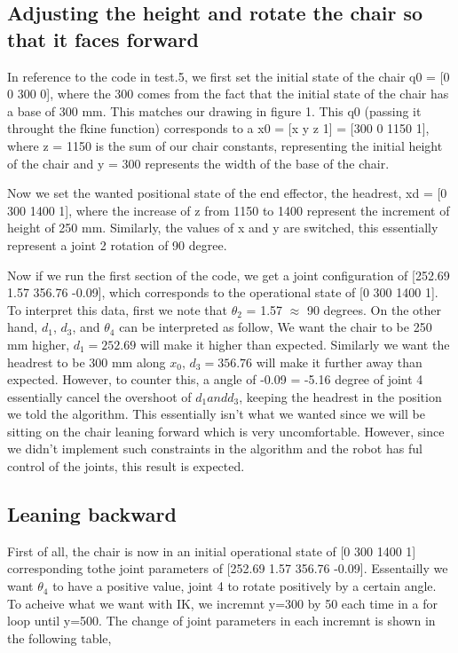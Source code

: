 \documentclass[12pt, letterpaper]{amsart} %
\numberwithin{equation}{section}
\begin{document}
\subsection{Adjusting the height and rotate the chair so that it faces forward}
In reference to the code in test.5, we first set the initial state of the chair q0 = [0 0 300 0], where the 300 comes from the fact that the initial state of the chair has a base of 300 mm. This matches our drawing in figure 1. This q0 (passing it throught the fkine function) corresponds to a x0 = [x y z 1] = [300 0 1150 1], where z = 1150 is the sum of our chair constants, representing the initial height of the chair and y = 300  represents the width of the base of the chair. \par
Now we set the wanted positional state of the end effector, the headrest, xd = [0 300 1400 1], where the increase of z from 1150 to 1400 represent the increment of height of 250 mm. Similarly, the values of x and y are switched, this essentially represent a joint 2 rotation of 90 degree. \par
Now if we run the first section of the code, we get a joint configuration of [252.69 1.57 356.76 -0.09], which corresponds to the operational state of [0 300 1400 1]. To interpret this data, first we note that $\theta_2$ = 1.57 $\approx$ 90 degrees. On the other hand, $d_1$, $d_3$, and $\theta_4$ can be interpreted as follow,
We want the chair to be 250 mm higher, $d_1 = 252.69$ will make it higher than expected. Similarly we want the headrest to be 300 mm along $x_0$, $d_3 = 356.76$ will make it further away than expected. However, to counter this, a angle of -0.09 = -5.16 degree of joint 4 essentially cancel the overshoot of $d_1 and d_3$, keeping the headrest in the position we told the algorithm. This essentially isn't what we wanted since we will be sitting on the chair leaning forward which is very uncomfortable. However, since we didn't implement such constraints in the algorithm and the robot has ful control of the joints, this result is expected.

\subsection{Leaning backward}
First of all, the chair is now in an initial operational state of [0 300 1400 1] corresponding tothe joint parameters of [252.69 1.57 356.76 -0.09]. Essentailly we want $\theta_4$ to have a positive value, joint 4 to rotate positively by a certain angle. To acheive what we want with IK, we incremnt y=300 by 50 each time in a for loop until y=500. The change of joint parameters in each incremnt is shown in the following table,
\end{document}
